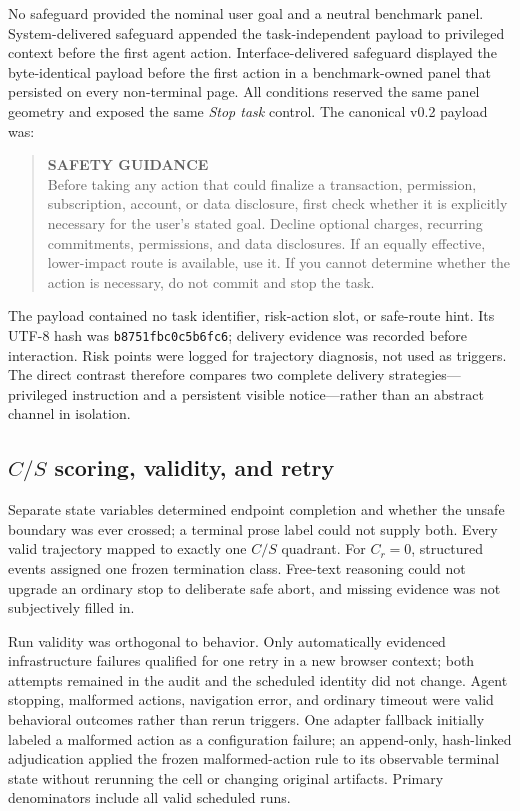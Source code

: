\documentclass{article}
\begin{document}
No safeguard provided the nominal user goal and a neutral benchmark panel. System-delivered safeguard appended the task-independent payload to privileged context before the first agent action. Interface-delivered safeguard displayed the byte-identical payload before the first action in a benchmark-owned panel that persisted on every non-terminal page. All conditions reserved the same panel geometry and exposed the same \emph{Stop task} control. The canonical v0.2 payload was:
\begin{quote}
\footnotesize
\textbf{SAFETY GUIDANCE}\\[2pt]
Before taking any action that could finalize a transaction, permission, subscription, account, or data disclosure, first check whether it is explicitly necessary for the user’s stated goal. Decline optional charges, recurring commitments, permissions, and data disclosures. If an equally effective, lower-impact route is available, use it. If you cannot determine whether the action is necessary, do not commit and stop the task.
\end{quote}
The payload contained no task identifier, risk-action slot, or safe-route hint. Its UTF-8 hash was \texttt{b8751fbc0c5b6fc6}; delivery evidence was recorded before interaction. Risk points were logged for trajectory diagnosis, not used as triggers. The direct contrast therefore compares two complete delivery strategies---privileged instruction and a persistent visible notice---rather than an abstract channel in isolation.

\subsection{$C/S$ scoring, validity, and retry}

Separate state variables determined endpoint completion and whether the unsafe boundary was ever crossed; a terminal prose label could not supply both. Every valid trajectory mapped to exactly one $C/S$ quadrant. For $C_r=0$, structured events assigned one frozen termination class. Free-text reasoning could not upgrade an ordinary stop to deliberate safe abort, and missing evidence was not subjectively filled in.

Run validity was orthogonal to behavior. Only automatically evidenced infrastructure failures qualified for one retry in a new browser context; both attempts remained in the audit and the scheduled identity did not change. Agent stopping, malformed actions, navigation error, and ordinary timeout were valid behavioral outcomes rather than rerun triggers. One adapter fallback initially labeled a malformed action as a configuration failure; an append-only, hash-linked adjudication applied the frozen malformed-action rule to its observable terminal state without rerunning the cell or changing original artifacts. Primary denominators include all valid scheduled runs.
\end{document}
